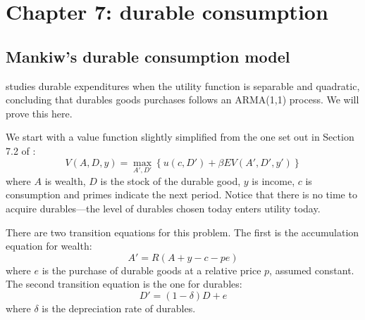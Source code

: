 \section{Chapter 7: durable consumption}

\subsection{Mankiw's durable consumption model}

\citet{mankiw1982hall} studies durable expenditures when the utility function is separable and quadratic, concluding that durables goods purchases follows an ARMA(1,1) process. We will prove this here.

We start with a value function slightly simplified from the one set out in Section 7.2 of \citet{adda2003dynamic}:
%
\begin{equation}
	V(A, D, y) = \max_{A', D'} \left\{ u(c, D') + \beta EV(A', D', y') \right\}
\end{equation}
%
where \(A\) is wealth, \(D\) is the stock of the durable good, \(y\) is income, \(c\) is consumption and primes indicate the next period. Notice that there is no time to acquire durables---the level of durables chosen today enters utility today.

There are two transition equations for this problem. The first is the accumulation equation for wealth:
%
\begin{equation}
	A' = R(A + y - c - pe)
\end{equation}
%
where \(e\) is the purchase of durable goods at a relative price \(p\), assumed constant. The second transition equation is the one for durables:
%
\begin{equation}
	D' = (1 - \delta)D + e \label{eqn:evoD}
\end{equation}
%
where \(\delta\) is the depreciation rate of durables.

